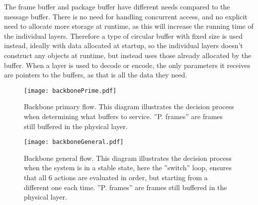 The frame buffer and package buffer have different needs compared to the message buffer. There is no need for handling concurrent access, and no explicit need to allocate more storage at runtime, as this will increase the running time of the individual layers.
Therefore a type of circular buffer with fixed size is used instead, ideally with data allocated at startup, so the individual layers doesn't construct any objects at runtime, but instead uses those already allocated by the buffer.
When a layer is used to decode or encode, the only parameters it receives are pointers to the buffers, as that is all the data they need.

\begin{figure}[htb]
	\begin{center}
	\texttt{[image: backbonePrime.pdf]}
	\caption{Backbone primary flow. This diagram illustrates the decision process when determining what buffers to service. ''P. frames'' are frames still buffered in the physical layer.}
	\label{fig:backboneprime}	
	\end{center}
\end{figure}

\begin{figure}[htb]
	\begin{center}
	\texttt{[image: backboneGeneral.pdf]}
	\caption{Backbone general flow. This diagram illustrates the decision process when the system is in a stable state, here the ''switch'' loop, ensures that all 6 actions are evaluated in order, but starting from a different one each time. ''P. frames'' are frames still buffered in the physical layer.}
	\label{fig:backbonegeneral}	
	\end{center}
\end{figure}
